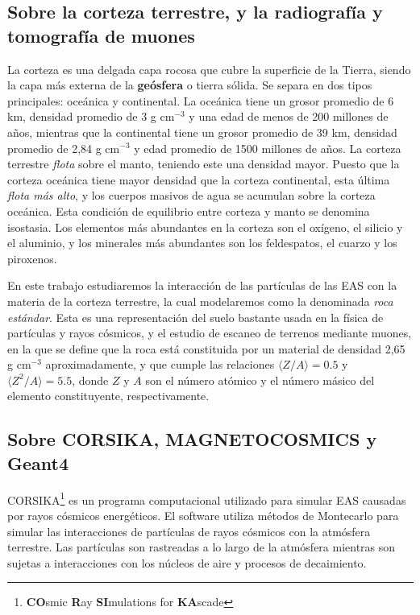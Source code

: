 \documentclass[12pt]{report}
\begin{document}


\subsection*{Sobre la corteza terrestre, y la radiografía y tomografía de muones}

La corteza es una delgada capa rocosa que cubre la superficie de la Tierra, siendo la capa más externa de la \textbf{geósfera} o tierra sólida. Se separa en dos tipos principales: oceánica y continental. La oceánica tiene un grosor promedio de 6 km, densidad promedio de 3 g cm$^{-3}$ y una edad de menos de 200 millones de años, mientras que la continental tiene un grosor promedio de 39 km, densidad promedio de 2,84 g cm$^{-3}$ y edad promedio de 1500 millones de años. \cite{mooney20101} La corteza terrestre \textit{flota} sobre el manto, teniendo este una densidad mayor. Puesto que la corteza oceánica tiene mayor densidad que la corteza continental, esta última \textit{flota más alto}, y los cuerpos masivos de agua se acumulan sobre la corteza oceánica. Esta condición de equilibrio entre corteza y manto se denomina isostasia. Los elementos más abundantes en la corteza son el oxígeno, el silicio y el aluminio, y los minerales más abundantes son los feldespatos, el cuarzo y los piroxenos. \cite{anderson2010geomorphology}

En este trabajo estudiaremos la interacción de las partículas de las EAS con la materia de la corteza terrestre, la cual modelaremos como la denominada \textit{roca estándar}. Esta es una representación del suelo bastante usada en la física de partículas y rayos cósmicos, y el estudio de escaneo de terrenos mediante muones, en la que se define que la roca está constituida por un material de densidad 2,65 g cm$^{-3}$ aproximadamente, y que cumple las relaciones $\langle Z/A \rangle=0.5$ y $\langle Z^2/A \rangle=5.5$, donde $Z$ y $A$ son el número atómico y el número másico del elemento constituyente, respectivamente. \cite{groom2001muon}



\subsection*{Sobre CORSIKA, MAGNETOCOSMICS y Geant4}

CORSIKA\footnote{\textbf{CO}smic \textbf{R}ay \textbf{SI}mulations for \textbf{KA}scade} es un programa computacional utilizado para simular EAS causadas por rayos cósmicos energéticos. El software utiliza métodos de Montecarlo para simular las interacciones de partículas de rayos cósmicos con la atmósfera terrestre. Las partículas son rastreadas a lo largo de la atmósfera mientras son sujetas a interacciones con los núcleos de aire y procesos de decaimiento.
\end{document}
